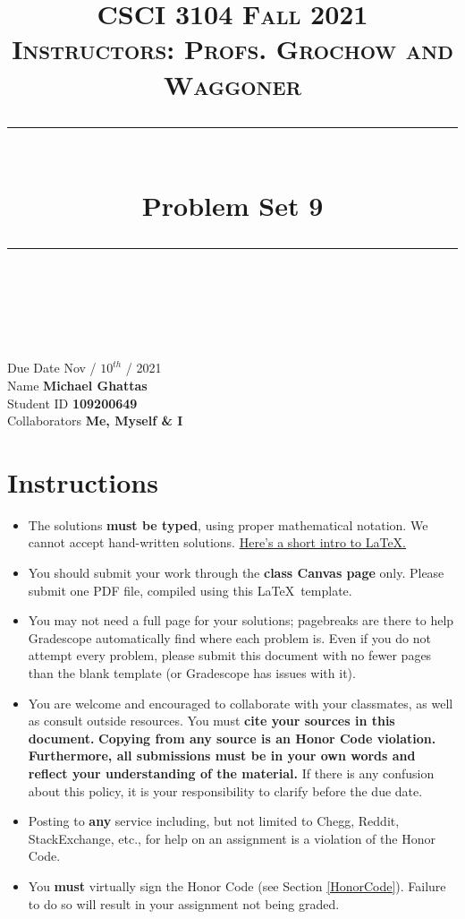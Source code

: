 \documentclass[11pt]{article}
\title{
\normalfont \normalsize 
\textsc{CSCI 3104 Fall 2021 \\ 
Instructors: Profs. Grochow and Waggoner} \\
[10pt] 
\rule{\linewidth}{0.5pt} \\[6pt] 
\huge Problem Set 9 \\
\rule{\linewidth}{2pt}  \\[10pt]
}
\date{}
\theoremstyle{definition}
\theoremstyle{definition}
\theoremstyle{definition}
\begin{document}
\maketitle


\noindent
Due Date \dotfill Nov / $10^{th}$ / 2021 \\
Name \dotfill \textbf{Michael Ghattas} \\
Student ID \dotfill \textbf{109200649} \\
Collaborators \dotfill \textbf{Me, Myself \& I}

\tableofcontents

\section{Instructions}
 \begin{itemize}
	\item The solutions \textbf{must be typed}, using proper mathematical notation. We cannot accept hand-written solutions. \href{http://ece.uprm.edu/~caceros/latex/introduction.pdf}{Here's a short intro to \LaTeX.}
	\item You should submit your work through the \textbf{class Canvas page} only. Please submit one PDF file, compiled using this \LaTeX \ template.
	\item You may not need a full page for your solutions; pagebreaks are there to help Gradescope automatically find where each problem is. Even if you do not attempt every problem, please submit this document with no fewer pages than the blank template (or Gradescope has issues with it).

	\item You are welcome and encouraged to collaborate with your classmates, as well as consult outside resources. You must \textbf{cite your sources in this document.} \textbf{Copying from any source is an Honor Code violation. Furthermore, all submissions must be in your own words and reflect your understanding of the material.} If there is any confusion about this policy, it is your responsibility to clarify before the due date. 

	\item Posting to \textbf{any} service including, but not limited to Chegg, Reddit, StackExchange, etc., for help on an assignment is a violation of the Honor Code.

	\item You \textbf{must} virtually sign the Honor Code (see Section \ref{HonorCode}). Failure to do so will result in your assignment not being graded.
\end{itemize}
\end{document}
